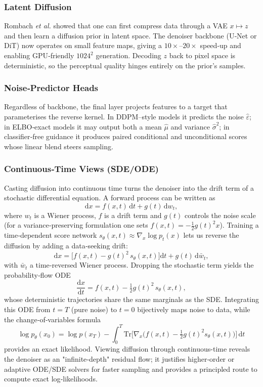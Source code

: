 \documentclass{article}
\begin{document}
\subsubsection{Latent Diffusion}  
Rombach \textit{et al.} showed that one can first compress data through a VAE \(x\mapsto z\) and then learn a diffusion prior in latent space. The denoiser backbone (U‑Net or DiT) now operates on small feature maps, giving a \(10\times\)–\(20\times\) speed‑up and enabling GPU‑friendly \(1024^2\) generation.  Decoding \(z\) back to pixel space is deterministic, so the perceptual quality hinges entirely on the prior’s samples.

\subsubsection{Noise‑Predictor Heads}  
Regardless of backbone, the final layer projects features to a target that parameterises the reverse kernel. In DDPM–style models it predicts the noise \(\hat\varepsilon\); in ELBO‑exact models it may output both a mean \(\hat\mu\) and variance \(\hat\sigma^2\); in classifier‑free guidance it produces paired conditional and unconditional scores whose linear blend steers sampling.

\subsubsection{Continuous‑Time Views (SDE/ODE)}
Casting diffusion into continuous time turns the denoiser into the drift term of a stochastic differential equation.  A forward process can be written as  
\[
  \mathrm{d}x
  = f(x,t)\,\mathrm{d}t
  + g(t)\,\mathrm{d}w_t ,
\]
where \(w_t\) is a Wiener process, \(f\) is a drift term and \(g(t)\) controls the noise scale (for a variance‑preserving formulation one sets \(f(x,t)=-\tfrac12 g(t)^2 x\)).  Training a time‑dependent score network \(s_\theta(x,t)\approx\nabla_x\log p_t(x)\) lets us reverse the diffusion by adding a data‑seeking drift:  
\[
  \mathrm{d}x
  = \bigl[f(x,t) - g(t)^2\,s_\theta(x,t)\bigr]\mathrm{d}t
  + g(t)\,\mathrm{d}\bar w_t ,
\]
with \(\bar w_t\) a time‑reversed Wiener process.  Dropping the stochastic term yields the probability‑flow ODE  
\[
  \frac{\mathrm{d}x}{\mathrm{d}t}
  = f(x,t) - \tfrac12 g(t)^2\,s_\theta(x,t) ,
\]
whose deterministic trajectories share the same marginals as the SDE.  Integrating this ODE from \(t=T\) (pure noise) to \(t=0\) bijectively maps noise to data, while the change‑of‑variables formula  
\[
  \log p_\theta(x_0)
  = \log p(x_T)
    - \int_{0}^{T}
      \mathrm{Tr}\!\bigl[
        \nabla_x\bigl(f(x,t)-\tfrac12 g(t)^2 s_\theta(x,t)\bigr)
      \bigr]\,\mathrm{d}t
\]
provides an exact likelihood. Viewing diffusion through continuous-time reveals the denoiser as an "infinite‑depth" residual flow; it justifies higher‑order or adaptive ODE/SDE solvers for faster sampling and provides a principled route to compute exact log‑likelihoods.
\end{document}

